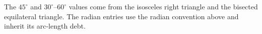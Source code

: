 

\begin{remark*}
The $45^\circ$ and $30^\circ$--$60^\circ$ values come from the isosceles right
triangle and the bisected equilateral triangle. The radian entries use the
radian convention above and inherit its arc-length debt.
\end{remark*}
